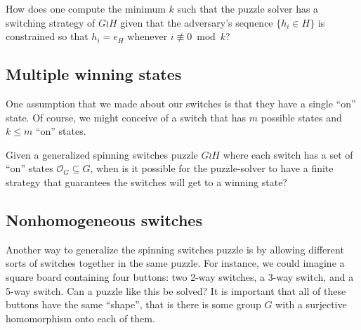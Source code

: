\begin{openquestion}
  How does one compute the minimum $k$ such that the puzzle solver has a
  switching strategy of $G \wr H$ given that the adversary's sequence
  $\{h_i \in H\}$ is constrained so that $h_i = e_H$ whenever ${i \not\equiv 0 \bmod k}$?
\end{openquestion}

\subsection{Multiple winning states}
One assumption that we made about our switches is that they have a single
``on'' state. Of course, we might conceive of a switch that has $m$ possible
states and $k \leq m$ ``on'' states.

\begin{openquestion}
  Given a generalized spinning switches puzzle $G \wr H$ where each switch has
  a set of ``on'' states $\mathcal{O}_G \subseteq G$, when is it possible for
  the puzzle-solver to have a finite strategy that guarantees the switches will
  get to a winning state?
\end{openquestion}

\subsection{Nonhomogeneous switches}

Another way to generalize the spinning switches puzzle is by allowing different
sorts of switches together in the same puzzle.
For instance, we could imagine a square board
containing four buttons: two 2-way switches, a 3-way switch, and a 5-way switch.
Can a puzzle like this be solved?
It is important that all of these buttons have the same ``shape'', that is
there is some group $G$ with a surjective homomorphism onto each of them.



